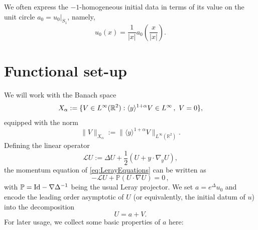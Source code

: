 \documentclass[12pt,reqno]{amsart}
\theoremstyle{plain}
\theoremstyle{definition}
\newcommand{\R}{\mathbb{R}}
\renewcommand{\:}{\colon}
\let\div\relax
\DeclareMathOperator{\div}{div}
\numberwithin{equation}{section}
\numberwithin{figure}{section}
\begin{document}
We often express the $-1$-homogeneous initial data in terms of its value on the unit circle $a_0 = u_0|_{S_1}$, namely,
\begin{equation}
    u_0(x) = \frac{1}{|x|} a_0 \left(\frac{x}{|x|}\right).
\end{equation}


\section{Functional set-up}

We will work with the Banach space
\begin{equation}
	X_\alpha := \{ V \in L^\infty(\R^2) : \langle y \rangle^{1+\alpha} V \in L^\infty \, , \  \div V = 0 \},
\end{equation}
equipped with the norm
\begin{equation}
	\| V \|_{X_\alpha} := \| \langle y \rangle^{1+\alpha} V \|_{L^\infty(\R^2)} .
\end{equation}
Defining the linear operator
\begin{equation} \label{eq:Leray}
	 \mathcal{L} U :=  \Delta U + \frac{1}{2} (U + y \cdot \nabla_y U),
\end{equation}
the momentum equation of \eqref{eq:LerayEquations} can be written as
\begin{equation}
	-\mathcal{L} U + \mathbb{P} (U \cdot \nabla U) = 0 \, ,
\end{equation}
with $\mathbb{P} = \text{Id} - \nabla \Delta^{-1} \div$ being the usual Leray projector.  We set $ a = e^\Delta u_0$ and encode the leading order asymptotic of $U$ (or equivalently, the initial datum of $u$) into the decomposition
\begin{equation}
	U = a + V.
\end{equation}
For later usage, we collect some basic properties of $a$ here:
\end{document}

